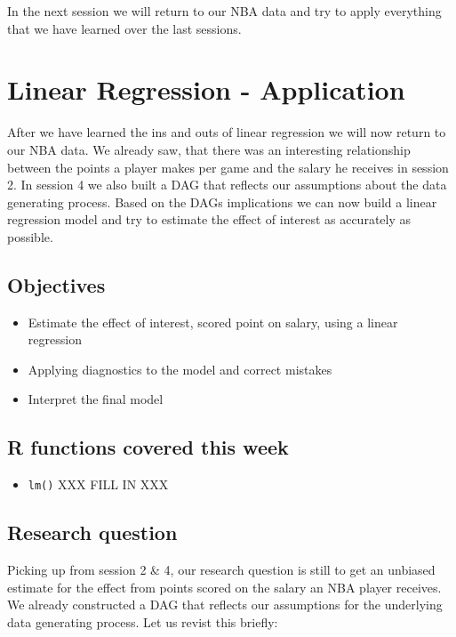 \documentclass[
]{book}
\providecommand{\tightlist}{%
  \setlength{\itemsep}{0pt}\setlength{\parskip}{0pt}}
\begin{document}
In the next session we will return to our NBA data and try to apply everything
that we have learned over the last sessions.

\hypertarget{lin-a}{%
\chapter{Linear Regression - Application}\label{lin-a}}

After we have learned the ins and outs of linear regression we will now
return to our NBA data.
We already saw, that there was an interesting relationship between the
points a player makes per game and the salary he receives in session 2. In
session 4 we also built a DAG that reflects our assumptions about the data
generating process. Based on the DAGs implications we can now build a linear
regression model and try to estimate the effect of interest as accurately as
possible.

\hypertarget{objectives-6}{%
\section{Objectives}\label{objectives-6}}

\begin{itemize}
\tightlist
\item
  Estimate the effect of interest, scored point on salary, using a linear regression
\item
  Applying diagnostics to the model and correct mistakes
\item
  Interpret the final model
\end{itemize}

\hypertarget{r-functions-covered-this-week-1}{%
\section{R functions covered this week}\label{r-functions-covered-this-week-1}}

\begin{itemize}
\tightlist
\item
  \texttt{lm()}
  XXX FILL IN XXX
\end{itemize}

\hypertarget{research-question}{%
\section{Research question}\label{research-question}}

Picking up from session 2 \& 4, our research question is still to get an unbiased
estimate for the effect from points scored on the salary an NBA player receives.
We already constructed a DAG that reflects our assumptions for the underlying
data generating process. Let us revist this briefly:
\end{document}
